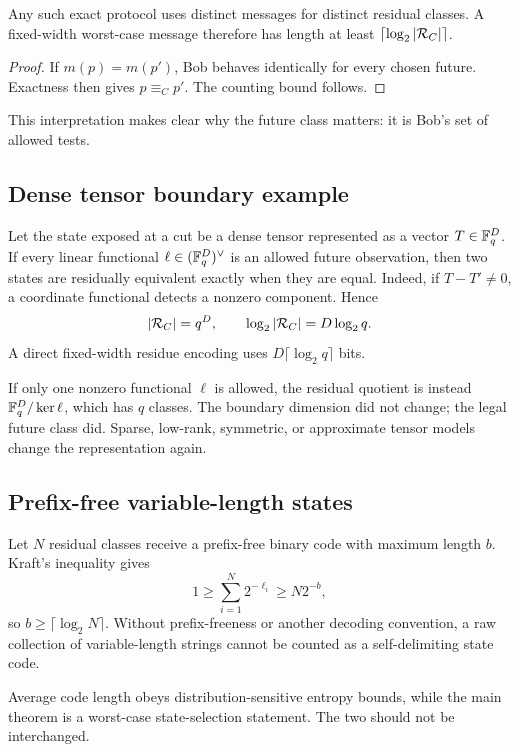 \begin{proposition}
\label{prop:one-way-residual-bound}
Any such exact protocol uses distinct messages for distinct residual classes.
A fixed-width worst-case message therefore has length at least
$\lceil\log_2|\mathcal R_C|\rceil$.
\end{proposition}

\begin{proof}
If $m(p)=m(p')$, Bob behaves identically for every chosen future.  Exactness
then gives $p\equiv_Cp'$.  The counting bound follows.
\end{proof}

This interpretation makes clear why the future class matters: it is Bob's set
of allowed tests.

\subsection{Dense tensor boundary example}

Let the state exposed at a cut be a dense tensor represented as a vector
$T\in\mathbb{F}_q^D$.  If every linear functional
$\ell\in(\mathbb{F}_q^D)^\vee$ is an allowed future observation, then two states are
residually equivalent exactly when they are equal.  Indeed, if $T-T'\ne0$, a
coordinate functional detects a nonzero component.  Hence
\[
  |\mathcal R_C|=q^D,
  \qquad
  \log_2|\mathcal R_C|=D\log_2q.
\]
A direct fixed-width residue encoding uses $D\lceil\log_2q\rceil$ bits.

If only one nonzero functional $\ell$ is allowed, the residual quotient is
instead $\mathbb{F}_q^D/\ker\ell$, which has $q$ classes.  The boundary dimension did
not change; the legal future class did.  Sparse, low-rank, symmetric, or
approximate tensor models change the representation again.

\subsection{Prefix-free variable-length states}

Let $N$ residual classes receive a prefix-free binary code with maximum length
$b$.  Kraft's inequality gives
\[
  1\ge\sum_{i=1}^{N}2^{-\ell_i}
  \ge N2^{-b},
\]
so $b\ge\lceil\log_2N\rceil$.  Without prefix-freeness or another decoding
convention, a raw collection of variable-length strings cannot be counted as a
self-delimiting state code.

Average code length obeys distribution-sensitive entropy bounds, while the
main theorem is a worst-case state-selection statement.  The two should not be
interchanged.

